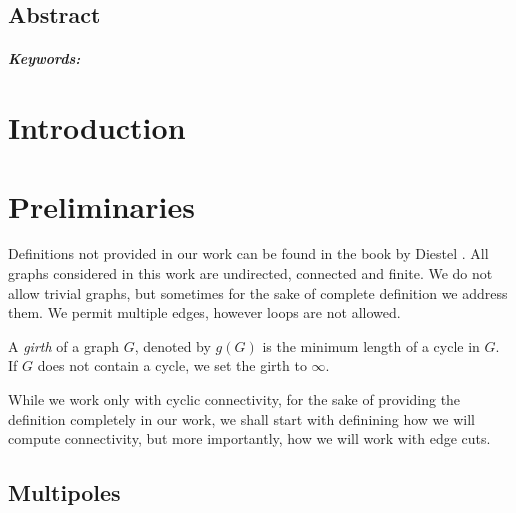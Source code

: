 \documentclass[12pt, twoside]{book}
\begin{document}
\newpage

\begin{otherlanguage}{USenglish}
    \section*{Abstract}

    \thesisabstracten{}

    \paragraph*{Keywords:} \thesiskeywordsen{}
\end{otherlanguage}

\newpage
\tableofcontents

\newpage
\listoffigures

\mainmatter{}

\chapter*{Introduction}

\chapter{Preliminaries}\label{ch:preliminaries}

Definitions not provided in our work can be found in the book  by Diestel \cite{Diestel}. All graphs considered in this work are undirected, connected and finite. We do not allow trivial graphs, but sometimes for the sake of complete definition we address them. We permit multiple edges, however loops are not allowed.

A \textit{girth} of a graph $G$, denoted by $g(G)$ is the minimum length of a cycle in $G$. If $G$ does not contain a cycle, we set the girth to $\infty$.

While we work only with cyclic connectivity, for the sake of providing the definition completely in our work, we shall start with definining how we will compute connectivity, but more importantly, how we will work with edge cuts.

\section{Multipoles}\label{sec:multipoles}
\end{document}
